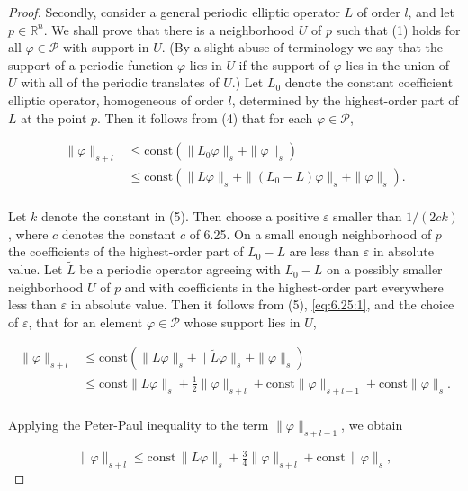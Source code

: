 \begin{proof}
Secondly, consider a general periodic elliptic operator $L$ of order $l$, and let $p \in \mathbb{R}^n$. We shall prove that there is a neighborhood $U$ of $p$ such that (1) holds for all $\varphi \in \mathcal{P}$ with support in $U$. (By a slight abuse of terminology we say that the support of a periodic function $\varphi$ lies in $U$ if the support of $\varphi$ lies in the union of $U$ with all of the periodic translates of $U$.) Let $L_0$ denote the constant coefficient elliptic operator, homogeneous of order $l$, determined by the highest-order part of $L$ at the point $p$. Then it follows from (4) that for each $\varphi \in \mathcal{P}$,

\begin{equation}
\tag{5}\label{eq:6.29:5}
\begin{aligned}{\|\varphi\|_{s+l}}&{{}\leq\mathrm{const}\left(\|L_{0}\varphi\|_{s}+\|\varphi\|_{s}\right)}\\ {}&{{}\leq\mathrm{const}\left(\|L\varphi\|_{s}+\|(L_{0}-L)\varphi\|_{s}+\|\varphi\|_{s}\right).}\\ \end{aligned}
\end{equation}

Let $k$ denote the constant in (5). Then choose a positive $\varepsilon$ smaller than $1/(2ck)$, where $c$ denotes the constant $c$ of 6.25. On a small enough neighborhood of $p$ the coefficients of the highest-order part of $L_0-L$ are less than $\varepsilon$ in absolute value. Let $\tilde{L}$ be a periodic operator agreeing with $L_0-L$ on a possibly smaller neighborhood $U$ of $p$ and with coefficients in the highest-order part everywhere less than $\varepsilon$ in absolute value. Then it follows from (5), \eqref{eq:6.25:1}, and the choice of $\varepsilon$, that for an element $\varphi\in\mathcal{P}$ whose support lies in $U$,

\[
\begin{aligned}{\|\varphi\|_{s+l}}&{{}\leq\mathrm{const}\left(\|L\varphi\|_{s}+\|\tilde{L}\varphi\|_{s}+\|\varphi\|_{s}\right)}\\ {}&{{}\leq\mathrm{const}\|L\varphi\|_{s}+\frac{1}{2}\|\varphi\|_{s+l}+\mathrm{const}\|\varphi\|_{s+l-1}+\mathrm{const}\|\varphi\|_{s}.}\\ \end{aligned}
\]

Applying the Peter-Paul inequality to the term  $ \|\varphi\|_{s+l-1} $, we obtain

\[
\|\varphi\|_{s+l}\leq\mathrm{const}\,\|L\varphi\|_{s}+\tfrac{3}{4}\|\varphi\|_{s+l}+\mathrm{const}\,\|\varphi\|_{s},
\]


\end{proof}
